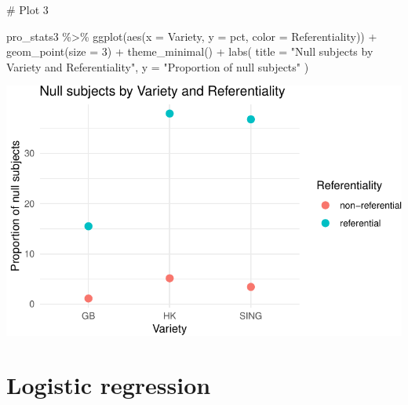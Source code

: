 \documentclass[
  11pt,
  letterpaper,
  DIV=11,
  numbers=noendperiod]{scrreprt}
\newenvironment{Shaded}{\begin{snugshade}}{\end{snugshade}}
\newcommand{\AttributeTok}[1]{\textcolor[rgb]{0.40,0.45,0.13}{#1}}
\newcommand{\CommentTok}[1]{\textcolor[rgb]{0.37,0.37,0.37}{#1}}
\newcommand{\DecValTok}[1]{\textcolor[rgb]{0.68,0.00,0.00}{#1}}
\newcommand{\FunctionTok}[1]{\textcolor[rgb]{0.28,0.35,0.67}{#1}}
\newcommand{\NormalTok}[1]{\textcolor[rgb]{0.00,0.23,0.31}{#1}}
\newcommand{\SpecialCharTok}[1]{\textcolor[rgb]{0.37,0.37,0.37}{#1}}
\newcommand{\StringTok}[1]{\textcolor[rgb]{0.13,0.47,0.30}{#1}}
\begin{document}
\begin{Shaded}
\begin{Highlighting}[]
\CommentTok{\# Plot 3}

\NormalTok{pro\_stats3 }\SpecialCharTok{\%\textgreater{}\%}
  \FunctionTok{ggplot}\NormalTok{(}\FunctionTok{aes}\NormalTok{(}\AttributeTok{x =}\NormalTok{ Variety, }\AttributeTok{y =}\NormalTok{ pct, }\AttributeTok{color =}\NormalTok{ Referentiality)) }\SpecialCharTok{+}
  \FunctionTok{geom\_point}\NormalTok{(}\AttributeTok{size =} \DecValTok{3}\NormalTok{) }\SpecialCharTok{+}
  \FunctionTok{theme\_minimal}\NormalTok{() }\SpecialCharTok{+}
  \FunctionTok{labs}\NormalTok{(}
    \AttributeTok{title =} \StringTok{"Null subjects by Variety and Referentiality"}\NormalTok{,}
    \AttributeTok{y =} \StringTok{"Proportion of null subjects"}
\NormalTok{  )}
\end{Highlighting}
\end{Shaded}

\includegraphics{Logistic_regression_files/figure-pdf/unnamed-chunk-4-3.pdf}

\section{Logistic regression}\label{logistic-regression-1}
\end{document}
